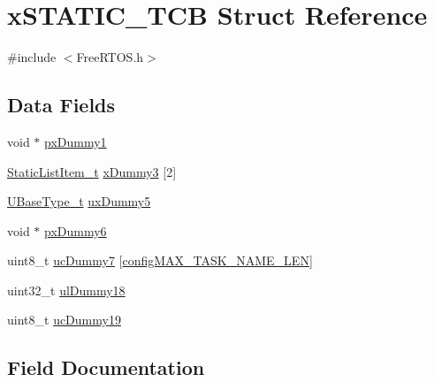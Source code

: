 \hypertarget{structx_s_t_a_t_i_c___t_c_b}{}\section{x\+S\+T\+A\+T\+I\+C\+\_\+\+T\+CB Struct Reference}
\label{structx_s_t_a_t_i_c___t_c_b}


{\ttfamily \#include $<$Free\+R\+T\+O\+S.\+h$>$}

\subsection*{Data Fields}
\begin{DoxyCompactItemize}
\item 
void $\ast$ \mbox{\hyperlink{structx_s_t_a_t_i_c___t_c_b_ae84725165c0efa82ef99b557ae6441a3}{px\+Dummy1}}
\item 
\mbox{\hyperlink{_free_r_t_o_s_8h_a1d31bc0472385a87424518da484d9e09}{Static\+List\+Item\+\_\+t}} \mbox{\hyperlink{structx_s_t_a_t_i_c___t_c_b_acbd968fbd6059e44009bb84bbc25cb1d}{x\+Dummy3}} \mbox{[}2\mbox{]}
\item 
\mbox{\hyperlink{portmacro_8h_a646f89d4298e4f5afd522202b11cb2e6}{U\+Base\+Type\+\_\+t}} \mbox{\hyperlink{structx_s_t_a_t_i_c___t_c_b_a0e266307381fece384ea3b4499e69b6f}{ux\+Dummy5}}
\item 
void $\ast$ \mbox{\hyperlink{structx_s_t_a_t_i_c___t_c_b_a76f9c413ec3b5c20c11afc867e5ed80e}{px\+Dummy6}}
\item 
uint8\+\_\+t \mbox{\hyperlink{structx_s_t_a_t_i_c___t_c_b_a53b726dadeaf28e49ae7c264d61cfc1d}{uc\+Dummy7}} \mbox{[}\mbox{\hyperlink{_free_r_t_o_s_config_8h_ac388dc4041aab6997348828eb27fc1a8}{config\+M\+A\+X\+\_\+\+T\+A\+S\+K\+\_\+\+N\+A\+M\+E\+\_\+\+L\+EN}}\mbox{]}
\item 
uint32\+\_\+t \mbox{\hyperlink{structx_s_t_a_t_i_c___t_c_b_a1ed5081a5e856f7e9a91cb576e392a04}{ul\+Dummy18}}
\item 
uint8\+\_\+t \mbox{\hyperlink{structx_s_t_a_t_i_c___t_c_b_a5140e0e79dcb02a51011a1aa4ef58876}{uc\+Dummy19}}
\end{DoxyCompactItemize}


\subsection{Field Documentation}
\mbox{\label{structx_s_t_a_t_i_c___t_c_b_ae84725165c0efa82ef99b557ae6441a3}} 

